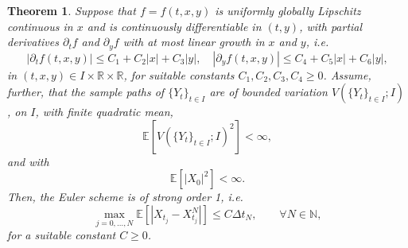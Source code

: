 \documentclass[reqno,12pt]{amsart}
\theoremstyle{plain}%
\newtheorem{thm}{Theorem}[section]
\theoremstyle{definition}
\begin{document}
\begin{thm}
    \label{thmdiffmonotonicbound}
    Suppose that $f=f(t, x, y)$ is uniformly globally Lipschitz continuous in $x$ and is continuously differentiable in $(t, y)$, with partial derivatives $\partial_t f$ and $\partial_y f$ with at most linear growth in $x$ and $y$, i.e.
    \begin{equation}
        \label{ftfylineargrowth}
        \left|\partial_t f(t, x, y)\right| \leq C_1 + C_2 |x| + C_3|y|, \quad \left|\partial_y f(t, x, y)\right| \leq C_4 + C_5|x| + C_6|y|,
    \end{equation}
    in $(t, x, y)\in I\times \mathbb{R}\times \mathbb{R}$,
    for suitable constants $C_1, C_2, C_3, C_4 \geq 0$.
    Assume, further, that the sample paths of $\{Y_t\}_{t\in I}$ are of bounded variation $V(\{Y_t\}_{t\in I}; I)$, on $I$, with finite quadratic mean,
    \begin{equation}
        \label{EYtboundedsquarevariation2}
        \mathbb{E}[V(\{Y_t\}_{t\in I}; I)^2] < \infty,
    \end{equation}
    and with
    \begin{equation}
        \label{EX0square2}
        \mathbb{E}[|X_0|^2] < \infty.
    \end{equation}
    Then, the Euler scheme is of strong order 1, i.e.
    \begin{equation}
        \max_{j=0, \ldots, N}\mathbb{E}\left[ \left| X_{t_j} - X_{t_j}^N \right| \right] \leq C \Delta t_N, \qquad \forall N \in \mathbb{N},
    \end{equation}
    for a suitable constant $C \geq 0$.
\end{thm}
\end{document}

